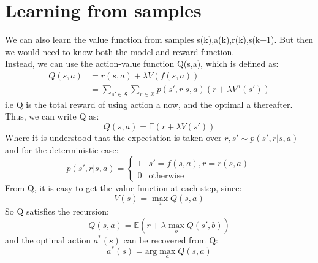 \documentclass{article}
\begin{document}
\section{Learning from samples}
We can also learn the value function from samples s(k),a(k),r(k),s(k+1). But then we would need to know both the model and reward function. \\
Instead, we can use the action-value function Q(s,a), which is defined as:
\[ 
\begin{aligned}
Q(s,a) &= r(s,a) + \lambda V(f(s,a)) \\
&= \sum_{s' \in \mathcal{S}} \sum_{r \in \mathcal{R}} p(s', r|s,a)(r + \lambda V^\pi(s'))
\end{aligned}
\]
i.e Q is the total reward of using action a now, and the optimal a thereafter. Thus, we can write Q as:
\[
Q(s,a) = \mathbb E(r + \lambda V(s'))
\]
Where it is understood that the expectation is taken over $r,s' \sim 
 p(s',r|s,a)$ and for the deterministic case:
\[
p(s',r|s,a) = \begin{cases}
1 & s'=f(s,a),r = r(s,a) \\
0 & \text{otherwise}
\end{cases}
\]
From Q, it is easy to get the value function at each step, since:
\[
V(s) = \max_a Q(s,a)
\]
So Q satisfies the recursion:
\[
Q(s,a) = \mathbb E(r + \lambda \max_b Q(s',b))
\]
and the optimal action $a^*(s)$ can be recovered from Q:
\[
a^*(s) = \text{arg} \max_a Q(s,a)
\]
\end{document}

